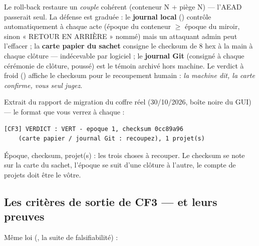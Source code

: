 Le roll-back restaure un \emph{couple} cohérent (conteneur N + piège N) — l'AEAD
passerait seul. La défense est graduée : le \textbf{journal local}
() contrôle automatiquement à chaque acte (époque du
conteneur $\geq$ époque du miroir, sinon « RETOUR EN ARRIÈRE » nommé) mais un attaquant
admin peut l'effacer ; la \textbf{carte papier du sachet} consigne le checksum de 8 hex
à la main à chaque clôture — indécevable par logiciel ; le \textbf{journal Git}
(consigné à chaque cérémonie de clôture, poussé) est le témoin archivé hors machine.
Le verdict à froid () affiche le checksum pour le recoupement humain :
\emph{la machine dit, la carte confirme, vous seul jugez}.

\begin{terrain}
Extrait du rapport de migration du coffre réel (30/10/2026, boîte noire du GUI) — le
format que vous verrez à chaque  :
\begin{lstlisting}
[CF3] VERDICT : VERT - epoque 1, checksum 0cc89a96
    (carte papier / journal Git : recoupez), 1 projet(s)
\end{lstlisting}
Époque, checksum, projet(s) : les trois choses à recouper. Le checksum se note sur la
carte du sachet, l'époque se suit d'une clôture à l'autre, le compte de projets doit
être le vôtre.
\end{terrain}

\subsection{Les critères de sortie de CF3 — et leurs preuves}

Même loi (, la suite de falsifiabilité) :

